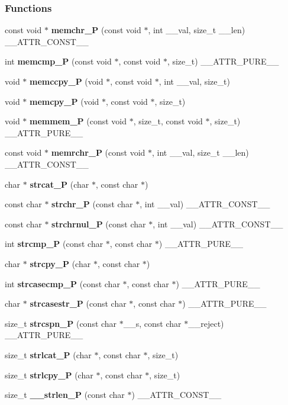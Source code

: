 \subsubsection*{Functions}
\begin{DoxyCompactItemize}
\item 
const void $\ast$ {\bf memchr\_\-P} (const void $\ast$, int \_\-\_\-val, size\_\-t \_\-\_\-len) \_\-\_\-ATTR\_\-CONST\_\-\_\-
\item 
int {\bf memcmp\_\-P} (const void $\ast$, const void $\ast$, size\_\-t) \_\-\_\-ATTR\_\-PURE\_\-\_\-
\item 
void $\ast$ {\bf memccpy\_\-P} (void $\ast$, const void $\ast$, int \_\-\_\-val, size\_\-t)
\item 
void $\ast$ {\bf memcpy\_\-P} (void $\ast$, const void $\ast$, size\_\-t)
\item 
void $\ast$ {\bf memmem\_\-P} (const void $\ast$, size\_\-t, const void $\ast$, size\_\-t) \_\-\_\-ATTR\_\-PURE\_\-\_\-
\item 
const void $\ast$ {\bf memrchr\_\-P} (const void $\ast$, int \_\-\_\-val, size\_\-t \_\-\_\-len) \_\-\_\-ATTR\_\-CONST\_\-\_\-
\item 
char $\ast$ {\bf strcat\_\-P} (char $\ast$, const char $\ast$)
\item 
const char $\ast$ {\bf strchr\_\-P} (const char $\ast$, int \_\-\_\-val) \_\-\_\-ATTR\_\-CONST\_\-\_\-
\item 
const char $\ast$ {\bf strchrnul\_\-P} (const char $\ast$, int \_\-\_\-val) \_\-\_\-ATTR\_\-CONST\_\-\_\-
\item 
int {\bf strcmp\_\-P} (const char $\ast$, const char $\ast$) \_\-\_\-ATTR\_\-PURE\_\-\_\-
\item 
char $\ast$ {\bf strcpy\_\-P} (char $\ast$, const char $\ast$)
\item 
int {\bf strcasecmp\_\-P} (const char $\ast$, const char $\ast$) \_\-\_\-ATTR\_\-PURE\_\-\_\-
\item 
char $\ast$ {\bf strcasestr\_\-P} (const char $\ast$, const char $\ast$) \_\-\_\-ATTR\_\-PURE\_\-\_\-
\item 
size\_\-t {\bf strcspn\_\-P} (const char $\ast$\_\-\_\-s, const char $\ast$\_\-\_\-reject) \_\-\_\-ATTR\_\-PURE\_\-\_\-
\item 
size\_\-t {\bf strlcat\_\-P} (char $\ast$, const char $\ast$, size\_\-t)
\item 
size\_\-t {\bf strlcpy\_\-P} (char $\ast$, const char $\ast$, size\_\-t)
\item 
size\_\-t {\bf \_\-\_\-strlen\_\-P} (const char $\ast$) \_\-\_\-ATTR\_\-CONST\_\-\_\-

\end{DoxyCompactItemize}
